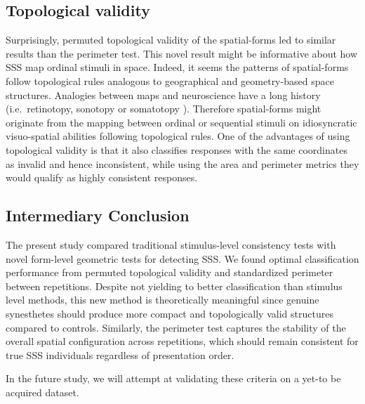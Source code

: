 \documentclass[
  man,
  floatsintext,
  longtable,
  a4paper,
  nolmodern,
  notxfonts,
  notimes,
  colorlinks=true,linkcolor=blue,citecolor=blue,urlcolor=blue]{apa7}
\begin{document}
\subsection{Topological validity}\label{topological-validity}

Surprisingly, permuted topological validity of the spatial-forms led to
similar results than the perimeter test. This novel result might be
informative about how SSS map ordinal stimuli in space. Indeed, it seems
the patterns of spatial-forms follow topological rules analogous to
geographical and geometry-based space structures. Analogies between maps
and neuroscience have a long history (i.e.~retinotopy, sonotopy or
somatotopy ).
Therefore spatial-forms might originate from the mapping between ordinal
or sequential stimuli on idiosyncratic visuo-spatial abilities following
topological rules. One of the advantages of using topological validity
is that it also classifies responses with the same coordinates as
invalid and hence inconsistent, while using the area and perimeter
metrics they would qualify as highly consistent responses.


\subsection{Intermediary Conclusion}\label{sec-conclusions}

The present study compared traditional stimulus-level consistency tests
with novel form-level geometric tests for detecting SSS. We found
optimal classification performance from permuted topological validity
and standardized perimeter between repetitions. Despite not yielding to
better classification than stimulus level methods, this new method is
theoretically meaningful since genuine synesthetes should produce more
compact and topologically valid structures compared to controls.
Similarly, the perimeter test captures the stability of the overall
spatial configuration across repetitions, which should remain consistent
for true SSS individuals regardless of presentation order.

In the future study, we will attempt at validating these criteria on a
yet-to be acquired dataset.
\end{document}
